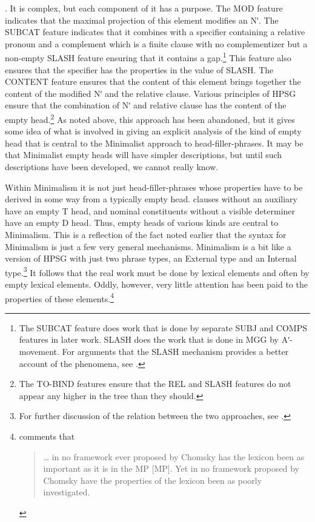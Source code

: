 \documentclass[output=paper]{langsci/langscibook}
\begin{document}
. It is complex, but each component of it has a purpose. The MOD
feature indicates that the maximal projection of this element modifies an Nʹ.
The SUBCAT feature indicates that it combines with a specifier containing a
relative pronoun and a complement which is a finite clause with no
complementizer but a non-empty SLASH feature ensuring that it contains a
gap.\footnote{The SUBCAT feature does work that is done by separate SUBJ and
COMPS features in later work. SLASH does the work that is done in \gls{MGG} by
Aʹ-movement. For arguments that the SLASH mechanism provides a better account
of the phenomena, see \citet{Borsley2012}.} This feature also ensures that the
specifier has the properties in the value of SLASH. The CONTENT feature ensures
that the content of this element brings together the content of the modified Nʹ
and the relative clause. Various principles of \gls{HPSG} ensure that the
combination of Nʹ and relative clause has the content of the empty
head.\footnote{The TO-BIND features ensure that the REL and SLASH features do
not appear any higher in the tree than they should.} As noted above, this
approach has been abandoned, but it gives some idea of what is involved in
giving an explicit analysis of the kind of empty head that is central to the
Minimalist approach to head-filler-phrases.  It may be that Minimalist empty
heads will have simpler descriptions, but until such descriptions have been
developed, we cannot really know.

Within Minimalism it is not just head-filler-phrases whose properties have to
be derived in some way from a typically empty head.  clauses without an
auxiliary have an empty T head, and  nominal constituents without a
visible determiner have an empty D head. Thus, empty heads of various kinds are
central to Minimalism. This is a reflection of the fact noted earlier that the
syntax for Minimalism is just a few very general mechanisms. Minimalism is a
bit like a version of \gls{HPSG} with just two phrase types, an External 
type and an Internal  type.\footnote{For further discussion of the
relation between the two approaches, see \citet{Muller2013}.} It follows that
the real work must be done by lexical elements and often by empty lexical
elements. Oddly, however, very little attention has been paid to the properties
of these elements.\footnote{\textcite[95, fn.\ 9]{Newmeyer2005} comments that
    \blockquote{\dots{} in no framework ever proposed by Chomsky has the
lexicon been as important as it is in the \gls{MP} [\glsdesc{MP}].
Yet in no framework proposed by Chomsky have the properties of the lexicon been
as poorly investigated.}}
\end{document}
